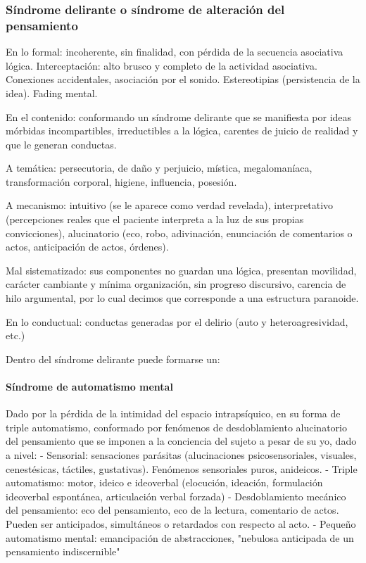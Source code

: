 \documentclass{scrbook}
\begin{document}
\subsubsection*{Síndrome delirante o síndrome de alteración del pensamiento}
En lo formal: incoherente, sin finalidad, con pérdida de la secuencia asociativa lógica. Interceptación: alto brusco y completo de la actividad asociativa. Conexiones accidentales, asociación por el sonido. Estereotipias (persistencia de la idea). Fading mental.

En el contenido: conformando un síndrome delirante que se manifiesta por ideas mórbidas incompartibles, irreductibles a la lógica, carentes de juicio de realidad y que le generan conductas.

A temática: persecutoria, de daño y perjuicio, mística, megalomaníaca, transformación corporal, higiene, influencia, posesión.

A mecanismo: intuitivo (se le aparece como verdad revelada), interpretativo (percepciones reales que el paciente interpreta a la luz de sus propias convicciones), alucinatorio (eco, robo, adivinación, enunciación de comentarios o actos, anticipación de actos, órdenes).

Mal sistematizado: sus componentes no guardan una lógica, presentan movilidad, carácter cambiante y mínima organización, sin progreso discursivo, carencia de hilo argumental, por lo cual decimos que corresponde a una estructura paranoide.

En lo conductual: conductas generadas por el delirio (auto y heteroagresividad, etc.)

Dentro del síndrome delirante puede formarse un:
\paragraph{Síndrome de automatismo mental}
Dado por la pérdida de la intimidad del espacio intrapsíquico, en su forma de triple automatismo, conformado por fenómenos de desdoblamiento alucinatorio del pensamiento que se imponen a la conciencia del sujeto a pesar de su yo, dado a nivel:
- Sensorial: sensaciones parásitas (alucinaciones psicosensoriales, visuales, cenestésicas, táctiles, gustativas). Fenómenos sensoriales puros, anideicos.
- Triple automatismo: motor, ideico e ideoverbal (elocución, ideación, formulación ideoverbal espontánea, articulación verbal forzada)
- Desdoblamiento mecánico del pensamiento: eco del pensamiento, eco de la lectura, comentario de actos. Pueden ser anticipados, simultáneos o retardados con respecto al acto.
- Pequeño automatismo mental: emancipación de abstracciones, "nebulosa anticipada de un pensamiento indiscernible"
\end{document}
